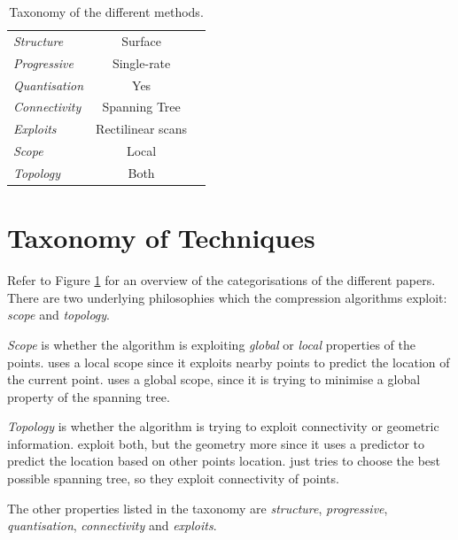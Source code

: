 \documentclass[a4paper]{report}
\begin{document}
\begin{table}[t]
{\begin{tabular}{||l|c|c||}
  \hline

  \emph{Structure} & Surface & \\

  \emph{Progressive} & Single-rate & \\

  \emph{Quantisation} & Yes & \\

  \emph{Connectivity} & Spanning Tree & \\

  \emph{Exploits} & Rectilinear scans & \\

  \emph{Scope} & Local & \\

  \emph{Topology} & Both & \\

  \hline
\end{tabular}
}
\caption{Taxonomy of the different methods.}\label{tab:taxonomy}
\end{table}


\section{Taxonomy of Techniques}

Refer to Figure \ref{tab:taxonomy} for an overview of the categorisations of
the different papers. There are two underlying philosophies which the
compression algorithms exploit: \emph{scope} and \emph{topology}.

\emph{Scope} is whether the algorithm is exploiting \emph{global} or
\emph{local} properties of the points. \citet{merrycomp} uses a local scope
since it exploits nearby points to predict the location of the current
point. \citet{chen2005lcp} uses a global scope, since it is trying to minimise
a global property of the spanning tree.

\emph{Topology} is whether the algorithm is trying to exploit connectivity or
geometric information. \citet{gumholdcomp} exploit both, but the geometry more
since it uses a predictor to predict the location based on other points
location. \citet{chen2005lcp} just tries to choose the best possible spanning
tree, so they exploit connectivity of points.

The other properties listed in the taxonomy are \emph{structure},
\emph{progressive}, \emph{quantisation}, \emph{connectivity} and
\emph{exploits}.
\end{document}
